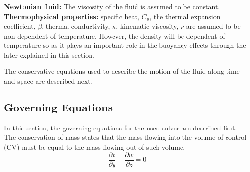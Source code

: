 \newline
\textbf{Newtonian fluid:} The viscosity of the fluid is assumed to be constant.
\newline
\textbf{Thermophysical properties:} specific heat, \textit{$C_p$}, the thermal expansion coefficient, \textit{$\beta$}, thermal conductivity, \textit{$\kappa$}, kinematic viscosity, \textit{$\nu$} are assumed to be non-dependent of temperature. However, the density will be dependent of temperature so as it plays an important role in the buoyancy effects through the later explained in this section.

The conservative equations used to describe the motion of the fluid along time and space are described next.
\subsection{Governing Equations}
In this section, the governing equations for the used solver are described first.
\newline
The conservation of mass states that the mass flowing into the volume of control (CV) must be equal to the mass flowing out of such volume. 
\begin{equation}
\frac{\partial v}{\partial y}+\frac{\partial w}{\partial z}=0
\label{3.5}
\end{equation}

